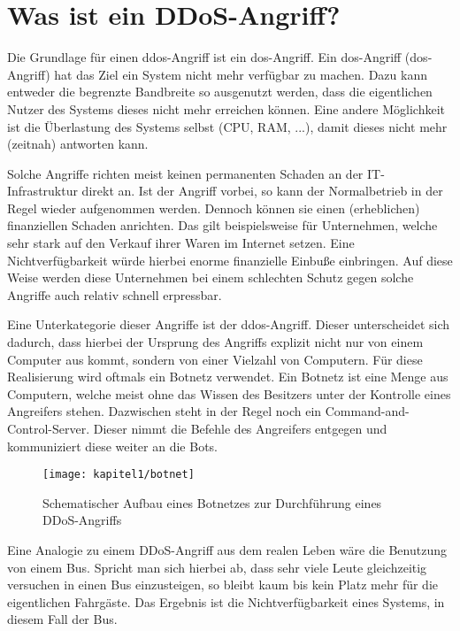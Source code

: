 \chapter{Was ist ein DDoS-Angriff?}
\label{chap:kapitel1}
Die Grundlage für einen \ac{ddos}-Angriff ist ein \ac{dos}-Angriff. Ein \ac{dos}-Angriff (\acl{dos}-Angriff) hat das Ziel ein System nicht mehr verfügbar zu machen. Dazu kann entweder die begrenzte Bandbreite so ausgenutzt werden, dass die eigentlichen Nutzer des Systems dieses nicht mehr erreichen können. Eine andere Möglichkeit ist die Überlastung des Systems selbst (CPU, RAM, ...), damit dieses nicht mehr (zeitnah) antworten kann.

Solche Angriffe richten meist keinen permanenten Schaden an der IT-Infrastruktur direkt an. Ist der Angriff vorbei, so kann der Normalbetrieb in der Regel wieder aufgenommen werden. Dennoch können sie einen (erheblichen) finanziellen Schaden anrichten. Das gilt beispielsweise für Unternehmen, welche sehr stark auf den Verkauf ihrer Waren im Internet setzen. Eine Nichtverfügbarkeit würde hierbei enorme finanzielle Einbuße einbringen. Auf diese Weise werden diese Unternehmen bei einem schlechten Schutz gegen solche Angriffe auch relativ schnell erpressbar.

Eine Unterkategorie dieser Angriffe ist der \acl{ddos}-Angriff. Dieser unterscheidet sich dadurch, dass hierbei der Ursprung des Angriffs explizit nicht nur von einem Computer aus kommt, sondern von einer Vielzahl von Computern. Für diese Realisierung wird oftmals ein Botnetz verwendet. Ein Botnetz ist eine Menge aus Computern, welche meist ohne das Wissen des Besitzers unter der Kontrolle eines Angreifers stehen. Dazwischen steht in der Regel noch ein Command-and-Control-Server. Dieser nimmt die Befehle des Angreifers entgegen und kommuniziert diese weiter an die Bots.

\begin{figure}[h]
		\centering
		\texttt{[image: kapitel1/botnet]}
		\caption[Schematischer Aufbau bei einem DDoS-Angriff mit einem Botnetz]{Schematischer Aufbau eines Botnetzes zur Durchführung eines DDoS-Angriffs}
		\label{img:botnet}
\end{figure}

Eine Analogie zu einem DDoS-Angriff aus dem realen Leben wäre die Benutzung von einem Bus. Spricht man sich hierbei ab, dass sehr viele Leute gleichzeitig versuchen in einen Bus einzusteigen, so bleibt kaum bis kein Platz mehr für die eigentlichen Fahrgäste. Das Ergebnis ist die Nichtverfügbarkeit eines Systems, in diesem Fall der Bus.
